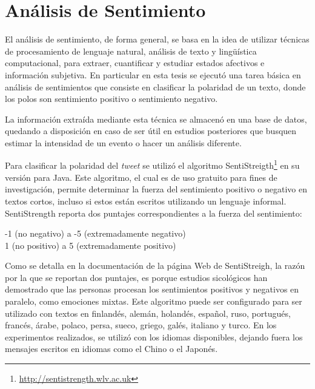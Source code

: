 \section{Análisis de Sentimiento}
\label{sec:sentimiento}

%
El análisis de sentimiento, de forma general, se basa en la idea de utilizar técnicas de procesamiento de lenguaje natural, análisis de texto y lingüística computacional, para extraer, cuantificar y estudiar estados afectivos e información subjetiva. 
%
En particular en esta tesis se ejecutó una tarea básica en análisis de sentimientos que consiste en clasificar la polaridad de un texto, donde los polos son sentimiento positivo o sentimiento negativo. 


%
%
La información extraída mediante esta técnica se almacenó en una base de datos, quedando a disposición en caso de ser útil en estudios posteriores que busquen estimar la intensidad de un evento o hacer un análisis diferente. 


Para clasificar la polaridad del \textit{tweet} se utilizó el algoritmo SentiStreigth\footnote{\url{http://sentistrength.wlv.ac.uk}} en su versión para Java. 
%
Este algoritmo, el cual es de uso gratuito para fines de investigación, permite determinar la fuerza del sentimiento positivo o negativo en textos cortos, incluso si estos están escritos utilizando un lenguaje informal. 
%
SentiStrength reporta dos puntajes correspondientes a la fuerza del sentimiento:

\begin{center}
-1 (no negativo) a -5 (extremadamente negativo)\\
1 (no positivo) a 5 (extremadamente positivo)
\end{center}

Como se detalla en la documentación de la página Web de SentiStreigh, la razón por la que se reportan dos puntajes, es porque estudios sicológicos han demostrado que las personas procesan los sentimientos positivos y negativos en paralelo, como emociones mixtas.
%
Este algoritmo puede ser configurado para ser utilizado con textos en finlandés, alemán, holandés, español, ruso, portugués, francés, árabe, polaco, persa, sueco, griego, galés, italiano y turco. 
%
En los experimentos realizados, se utilizó con los idiomas disponibles, dejando fuera los mensajes escritos en idiomas como el Chino o el Japonés.


